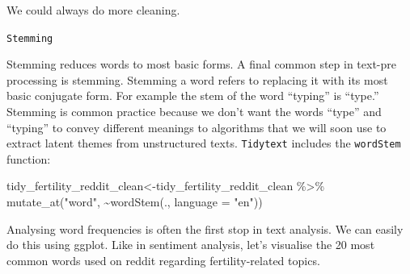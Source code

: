 \documentclass[
  letterpaper,
  DIV=11,
  numbers=noendperiod]{scrreprt}
\newenvironment{Shaded}{\begin{snugshade}}{\end{snugshade}}
\newcommand{\AttributeTok}[1]{\textcolor[rgb]{0.40,0.45,0.13}{#1}}
\newcommand{\FunctionTok}[1]{\textcolor[rgb]{0.28,0.35,0.67}{#1}}
\newcommand{\NormalTok}[1]{\textcolor[rgb]{0.00,0.23,0.31}{#1}}
\newcommand{\OtherTok}[1]{\textcolor[rgb]{0.00,0.23,0.31}{#1}}
\newcommand{\SpecialCharTok}[1]{\textcolor[rgb]{0.37,0.37,0.37}{#1}}
\newcommand{\StringTok}[1]{\textcolor[rgb]{0.13,0.47,0.30}{#1}}
\begin{document}
We could always do more cleaning.

\texttt{Stemming}

Stemming reduces words to most basic forms. A final common step in
text-pre processing is stemming. Stemming a word refers to replacing it
with its most basic conjugate form. For example the stem of the word
``typing'' is ``type.'' Stemming is common practice because we don't
want the words ``type'' and ``typing'' to convey different meanings to
algorithms that we will soon use to extract latent themes from
unstructured texts. \texttt{Tidytext} includes the \texttt{wordStem}
function:

\begin{Shaded}
\begin{Highlighting}[]
\NormalTok{  tidy\_fertility\_reddit\_clean}\OtherTok{\textless{}{-}}\NormalTok{tidy\_fertility\_reddit\_clean }\SpecialCharTok{\%\textgreater{}\%}
      \FunctionTok{mutate\_at}\NormalTok{(}\StringTok{"word"}\NormalTok{, }\SpecialCharTok{\textasciitilde{}}\FunctionTok{wordStem}\NormalTok{(., }\AttributeTok{language =} \StringTok{"en"}\NormalTok{))}
\end{Highlighting}
\end{Shaded}

Analysing word frequencies is often the first stop in text analysis. We
can easily do this using ggplot. Like in sentiment analysis, let's
visualise the 20 most common words used on reddit regarding
fertility-related topics.
\end{document}
